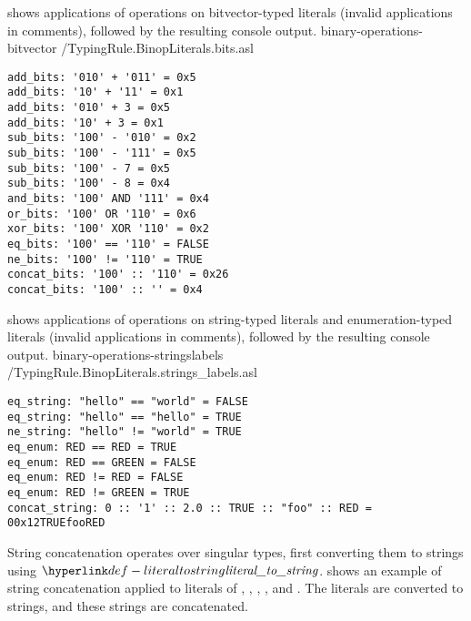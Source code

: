  shows applications
of operations on bitvector-typed literals (invalid applications in comments),
followed by the resulting console output.
  {binary-operations-bitvector}
  {\typingtests/TypingRule.BinopLiterals.bits.asl}

\begin{Verbatim}[fontsize=\footnotesize, frame=single]
add_bits: '010' + '011' = 0x5
add_bits: '10' + '11' = 0x1
add_bits: '010' + 3 = 0x5
add_bits: '10' + 3 = 0x1
sub_bits: '100' - '010' = 0x2
sub_bits: '100' - '111' = 0x5
sub_bits: '100' - 7 = 0x5
sub_bits: '100' - 8 = 0x4
and_bits: '100' AND '111' = 0x4
or_bits: '100' OR '110' = 0x6
xor_bits: '100' XOR '110' = 0x2
eq_bits: '100' == '110' = FALSE
ne_bits: '100' != '110' = TRUE
concat_bits: '100' :: '110' = 0x26
concat_bits: '100' :: '' = 0x4
\end{Verbatim}

 shows applications
of operations on string-typed literals and enumeration-typed literals (invalid applications in comments),
followed by the resulting console output.
  {binary-operations-stringslabels}
  {\typingtests/TypingRule.BinopLiterals.strings_labels.asl}

\begin{Verbatim}[fontsize=\footnotesize, frame=single]
eq_string: "hello" == "world" = FALSE
eq_string: "hello" == "hello" = TRUE
ne_string: "hello" != "world" = TRUE
eq_enum: RED == RED = TRUE
eq_enum: RED == GREEN = FALSE
eq_enum: RED != RED = FALSE
eq_enum: RED != GREEN = TRUE
concat_string: 0 :: '1' :: 2.0 :: TRUE :: "foo" :: RED = 00x12TRUEfooRED
\end{Verbatim}

String concatenation operates over singular types, first converting them to strings using $\literaltostring$.
 shows an example of string concatenation applied to literals of \integertypeterm{}, \bitvectortypeterm{}, \realtypeterm{}, \booleantypeterm{}, and \enumerationtypeterm{}.
The literals are converted to strings, and these strings are concatenated.

